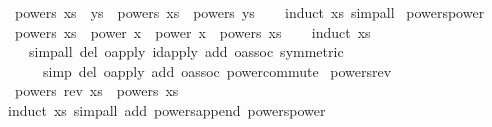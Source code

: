 \begin{isabellebody}
\ \ {}powers\ {}xs\ {}\ ys{}\ {}\ powers\ xs\ {}\ powers\ ys{}\isanewline
\ \ \isamarkupfalse%
\ {}induct\ xs{}\ simp{}all\isanewline
\isanewline
{}\isamarkupfalse%
\ powers{}power{}\isanewline
\ \ {}powers\ xs\ {}\ power\ x\ {}\ power\ x\ {}\ powers\ xs{}\isanewline
\ \ \isamarkupfalse%
\ {}induct\ xs{}\isanewline
\ \ \ \ {}simp{}all\ del{}\ o{}apply\ id{}apply\ add{}\ o{}assoc\ {}symmetric{}{}\isanewline
\ \ \ \ \ \ simp\ del{}\ o{}apply\ add{}\ o{}assoc\ power{}commute{}\isanewline
\isanewline
{}\isamarkupfalse%
\ powers{}rev{}\isanewline
\ \ {}powers\ {}rev\ xs{}\ {}\ powers\ xs{}\isanewline
\ \ \ \ \isamarkupfalse%
\ {}induct\ xs{}\ {}simp{}all\ add{}\ powers{}append\ powers{}power{}\isanewline
\isanewline
{}\isamarkupfalse%
%
\endisatagquote
{\isafoldquote}%
%
\isadelimquote

\end{isabellebody}
